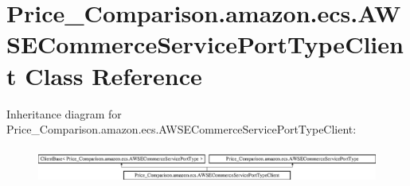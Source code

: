 \hypertarget{class_price___comparison_1_1amazon_1_1ecs_1_1_a_w_s_e_commerce_service_port_type_client}{\section{Price\-\_\-\-Comparison.\-amazon.\-ecs.\-A\-W\-S\-E\-Commerce\-Service\-Port\-Type\-Client Class Reference}
\label{class_price___comparison_1_1amazon_1_1ecs_1_1_a_w_s_e_commerce_service_port_type_client}
}
Inheritance diagram for Price\-\_\-\-Comparison.\-amazon.\-ecs.\-A\-W\-S\-E\-Commerce\-Service\-Port\-Type\-Client\-:\begin{figure}[H]
\begin{center}
\leavevmode
\includegraphics[height=1.181435cm]{class_price___comparison_1_1amazon_1_1ecs_1_1_a_w_s_e_commerce_service_port_type_client}
\end{center}
\end{figure}
